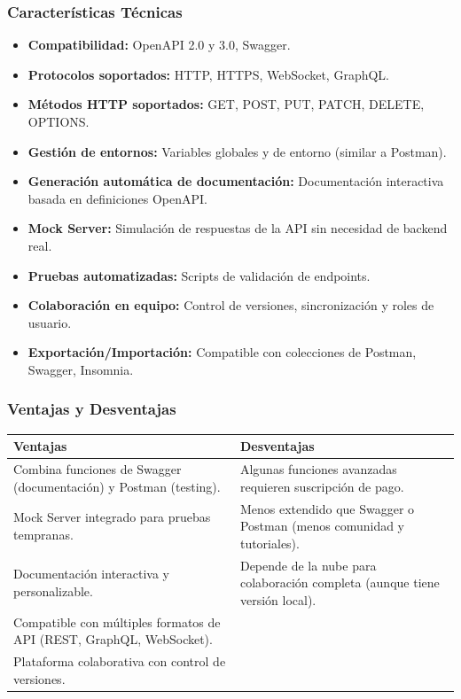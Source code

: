 \documentclass[man, floatsintext]{apa7}
\begin{document}
\subsubsection*{Características Técnicas} \cite{apidog_postman}

\begin{itemize}
	\item \textbf{Compatibilidad:} OpenAPI 2.0 y 3.0, Swagger.
	\item \textbf{Protocolos soportados:} HTTP, HTTPS, WebSocket, GraphQL.
	\item \textbf{Métodos HTTP soportados:} GET, POST, PUT, PATCH, DELETE, OPTIONS.
	\item \textbf{Gestión de entornos:} Variables globales y de entorno (similar a Postman).
	\item \textbf{Generación automática de documentación:} Documentación interactiva basada en definiciones OpenAPI.
	\item \textbf{Mock Server:} Simulación de respuestas de la API sin necesidad de backend real.
	\item \textbf{Pruebas automatizadas:} Scripts de validación de endpoints.
	\item \textbf{Colaboración en equipo:} Control de versiones, sincronización y roles de usuario.
	\item \textbf{Exportación/Importación:} Compatible con colecciones de Postman, Swagger, Insomnia.
\end{itemize}
\FloatBarrier

\subsubsection{Ventajas y Desventajas}

\begin{tabular}{|p{7cm}|p{7cm}|}
	\hline
	\textbf{Ventajas} & \textbf{Desventajas} \\
	\hline
	Combina funciones de Swagger (documentación) y Postman (testing). &
	Algunas funciones avanzadas requieren suscripción de pago. \\
	\hline
	Mock Server integrado para pruebas tempranas. &
	Menos extendido que Swagger o Postman (menos comunidad y tutoriales). \\
	\hline
	Documentación interactiva y personalizable. &
	Depende de la nube para colaboración completa (aunque tiene versión local). \\
	\hline
	Compatible con múltiples formatos de API (REST, GraphQL, WebSocket). & \\
	\hline
	Plataforma colaborativa con control de versiones. & \\
	\hline
\end{tabular}
\FloatBarrier
\end{document}
